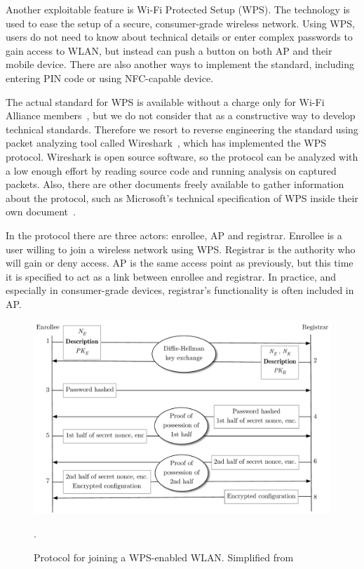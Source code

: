 \documentclass[12pt,a4paper,oneside,pdftex]{report}
\begin{document}
Another exploitable feature is Wi-Fi Protected Setup (WPS). The technology is used to ease the setup of a secure, consumer-grade wireless network. Using WPS, users do not need to know about technical details or enter complex passwords to gain access to WLAN, but instead can push a button on both AP and their mobile device. There are also another ways to implement the standard, including entering PIN code or using NFC-capable device.~\cite{alliance2007wi}

The actual standard for WPS is available without a charge only for Wi-Fi Alliance members~\cite{alliance2007wi}, but we do not consider that as a constructive way to develop technical standards. Therefore we resort to reverse engineering the standard using packet analyzing tool called Wireshark~\cite{wireshark}, which has implemented the WPS protocol. Wireshark is open source software, so the protocol can be analyzed with a low enough effort by reading source code and running analysis on captured packets. Also, there are other documents freely available to gather information about the protocol, such as Microsoft's technical specification of WPS inside their own document~\cite{microsoftWCN}.

In the protocol there are three actors: enrollee, AP and registrar. Enrollee is a user willing to join a wireless network using WPS. Registrar is the authority who will gain or deny access. AP is the same access point as previously, but this time it is specified to act as a link between enrollee and registrar. In practice, and especially in consumer-grade devices, registrar's functionality is often included in AP. 

\begin{figure}
    \includegraphics[width=\textwidth]{images/wps}
    \caption{Protocol for joining a WPS-enabled WLAN. Simplified from~\cite{microsoftWCN}}.
    \label{tab:wps}
\end{figure}
\end{document}
